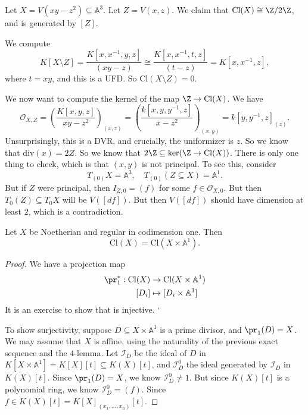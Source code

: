 \documentclass[a4paper]{article}
\newcommand\A{\mathbb{A}}
\renewcommand\div{\mathrm{div}}
\newcommand\Cl{\mathrm{Cl}}
\begin{document}
\begin{eg}
  Let $X = V(xy - z^2) \subseteq \A^3$. Let $Z = V(x, z)$. We claim that $\Cl(X) \cong \Z/2\Z$, and is generated by $[Z]$.

  We compute
  \[
    K[X \setminus Z] = \frac{K[x, x^{-1}, y, z]}{(xy - z)} \cong \frac{K[x, x^{-1}, t, z]}{(t - z)} = K[x, x^{-1}, z],
  \]
  where $t = xy$, and this is a UFD. So $\Cl(X \setminus Z) = 0$.

  We now want to compute the kernel of the map $\Z \to \Cl(X)$. We have
  \[
    \mathcal{O}_{X, Z} = \left(\frac{K[x, y, z]}{xy - z^2}\right)_{(x, z)} = \left(\frac{k[x, y, y^{-1}, z]}{x - z^2}\right)_{(x, y)} = k[y, y^{-1}, z]_{(z)}.
  \]
  Unsurprisingly, this is a DVR, and crucially, the uniformizer is $z$. So we know that $\div(x) = 2Z$. So we know that $2\Z \subseteq \ker(\Z \to \Cl(X))$. There is only one thing to check, which is that $(x, y)$ is not principal. To see this, consider
  \[
    T_{(0)}X = \A^3,\quad T_{(0)} (Z \subseteq X) = \A^1.
  \]
  But if $Z$ were principal, then $I_{Z, 0} = (f)$ for some $f \in \mathcal{O}_{X, 0}$. But then $T_0(Z) \subseteq T_0 X$ will be $V([df])$. But then $V([df])$ should have dimension at least $2$, which is a contradiction.
\end{eg}

\begin{prop}
  Let $X$ be Noetherian and regular in codimension one. Then
  \[
    \Cl(X) = \Cl(X \times \A^1).
  \]
\end{prop}
\begin{proof}
  We have a projection map
  \begin{align*}
    \pr_1^*: \Cl(X) &\to \Cl(X \times \A^1)\\
    [D_i] &\mapsto [D_i \times \A^1]
  \end{align*}
  It is an exercise to show that is injective. `

  To show surjectivity, suppose $D \subseteq X \times \A^1$ is a prime divisor, and $\pr_1(D) = X$. We may assume that $X$ is affine, using the naturality of the previous exact sequence and the $4$-lemma. Let $\mathcal{I}_D$ be the ideal of $D$ in $K[X \times \A^1] = K[X][t] \subseteq K(X) [t]$, and $\mathcal{I}_D^0$ the ideal generated by $\mathcal{I}_D$ in $K(X)[t]$. Since $\pr_1(D) = X$, we know $\mathcal{I}_D^0 \not= 1$. But since $K(X)[t]$ is a polynomial ring, we know $\mathcal{I}_D^0 = (f)$. Since $f \in K(X)[t] = K[X]_{(x_1, \ldots, x_n)} [t]$. %
\end{proof}
\end{document}
